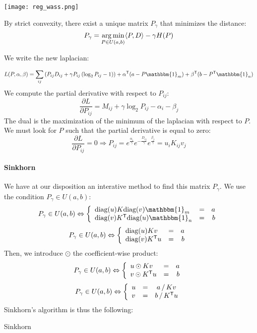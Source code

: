 \begin{center}
	\texttt{[image: reg\_wass.png]}
\end{center}

By strict convexity, there exist a unique matrix $P_\gamma$ that minimizes the distance:
$$ P_\gamma = \operatorname*{arg\,min}_{P \in U(a, b)} \langle P, D \rangle - \gamma H(P) $$


\dem

We write the new laplacian:

$$ L(P, \alpha, \beta) = \sum_{ij} \left( P_{ij} D_{ij} + \gamma P_{ij} \left( \log_2 P_{ij} - 1 \right) \right) + \alpha^\trans (a - P \mathbbm{1}_m) + \beta^\trans (b - P^\trans \mathbbm{1}_n) $$
We compute the partial derivative with respect to $P_{ij}$:
$$ \dfrac{\partial L}{\partial P_{ij}} = M_{ij} + \gamma \log_2 P_{ij} - \alpha_i - \beta_j $$
The dual is the maximization of the minimum of the laplacian with respect
to $P$. We must look for $P$ such that the partial derivative is equal to zero:
$$ \dfrac{\partial L}{\partial P_{ij}} = 0 \Rightarrow P_{ij} = e^{\frac{\alpha_i}{\gamma}} e^{-\frac{D_{ij}}{\gamma}}  e^{\frac{\beta_j}{\gamma}} = u_i K_{ij} v_j $$
\findem

\paragraph{Sinkhorn}
We have at our disposition an interative method to find this matrix $P_\gamma$. We use the condition $P_\gamma \in U(a,b)$:
$$ P_\gamma \in U(a, b) \Leftrightarrow \left\{ \begin{array}{lrr}
\text{diag}(u) K \text{diag}(v) \mathbbm{1}_m & = & a \\
\text{diag}(v) K^\trans \text{diag}(u) \mathbbm{1}_n & = & b
\end{array} \right. $$
$$ P_\gamma \in U(a, b) \Leftrightarrow \left\{ \begin{array}{lrr}
\text{diag}(u) K v & = & a \\
\text{diag}(v) K^{\mathsf{T}} u & = & b
\end{array} \right. $$
Then, we introduce $\odot$ the coefficient-wise product:
$$ P_\gamma \in U(a, b) \Leftrightarrow \left\{ \begin{array}{lrr}
u \odot K v & = & a \\
v \odot K^{\mathsf{T}} u & = & b
\end{array} \right. $$
$$ P_\gamma \in U(a, b) \Leftrightarrow \left\{ \begin{array}{lrc}
u & = & a \, / \, K v \\
v & = & b \, / \, K^{\mathsf{T}} u
\end{array} \right. $$
Sinkhorn's algorithm is thus the following: \\
\begin{algorithm}
	\caption{Sinkhorn}
\end{algorithm}

